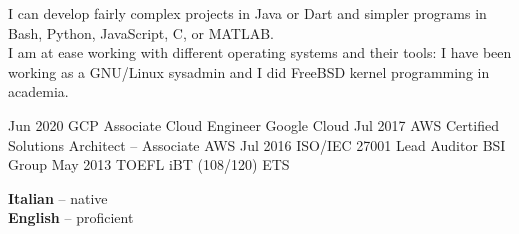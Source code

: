 \documentclass[9pt]{developercv}
\begin{document}

\begin{minipage}[t]{1\textwidth}
	\vspace{-\baselineskip}
	I can develop fairly complex projects in Java or Dart and simpler programs in Bash, Python, JavaScript, C, or MATLAB.
	\\
	I am at ease working with different operating systems and their tools: I have been working as a GNU/Linux sysadmin and I did FreeBSD kernel programming in academia.
\end{minipage}


\begin{entrylist}
	\entryCert
		{Jun 2020}
		{GCP Associate Cloud Engineer}
		{Google Cloud}
	\entryCert
		{Jul 2017}
		{AWS Certified Solutions Architect -- Associate}
		{AWS}
	\entryCert
		{Jul 2016}
		{ISO/IEC 27001 Lead Auditor}
		{BSI Group}
	\entryCert
		{May 2013}
		{TOEFL iBT (108/120)}
		{ETS}
\end{entrylist}

\begin{minipage}[t]{1\textwidth}
	\vspace{-\baselineskip}

	
	\textbf{Italian} -- native\\
	\textbf{English} -- proficient
\end{minipage}
\end{document}

